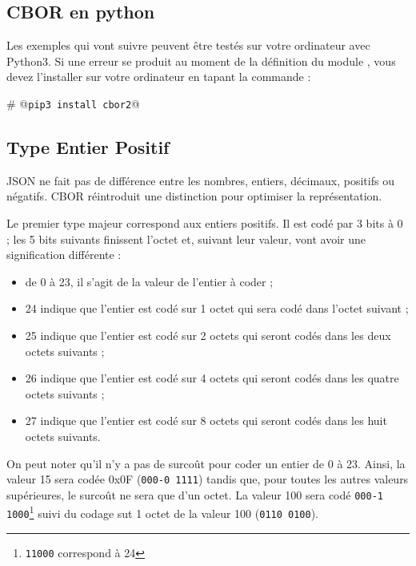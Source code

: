 \subsection{CBOR en python}
Les exemples qui vont suivre peuvent être testés sur votre ordinateur avec Python3. Si une erreur se produit au moment de la définition du module \texttt{}, vous devez l'installer sur votre ordinateur en tapant la commande :

\begin{termc}[backgroundcolor=\color{gray!10}, language=json, basicstyle=\ttfamily\small, escapechar=@]
# @\texttt{pip3 install cbor2}@
\end{termc}


\subsection{Type Entier Positif}
\ac{JSON} ne fait pas de différence entre les nombres, entiers, décimaux, positifs ou négatifs. \ac{CBOR} réintroduit une distinction pour optimiser la représentation.

      \vspace{1em}

Le premier type majeur correspond aux entiers positifs. Il est codé par 3 bits à 0 ; les 5 bits suivants finissent l'octet et, suivant leur valeur, vont avoir une signification différente :
\begin{itemize}
    \item de 0 à 23, il s'agit de la valeur de l'entier à coder ;
    \item 24 indique que l'entier est codé sur 1 octet qui sera codé dans l'octet suivant ;
    \item 25 indique que l'entier est codé sur 2 octets qui seront codés dans les deux octets suivants ;
    \item 26 indique que l'entier est codé sur 4 octets qui seront codés dans les quatre octets suivants ;
    \item 27 indique que l'entier est codé sur 8 octets qui seront codés dans les huit octets suivants.
\end{itemize}

      \vspace{1em}

On peut noter qu'il n'y a pas de surcoût pour coder un entier de 0 à 23. Ainsi, la valeur 15 sera codée 0x0F (\texttt{000-0 1111}) tandis que, pour toutes les autres valeurs supérieures, le surcoût ne sera que d'un octet. La valeur 100 sera codé \texttt{000-1 1000}\footnote{\texttt{11000} correspond à 24} suivi du codage sut 1 octet de la valeur 100 (\texttt{0110 0100}).

